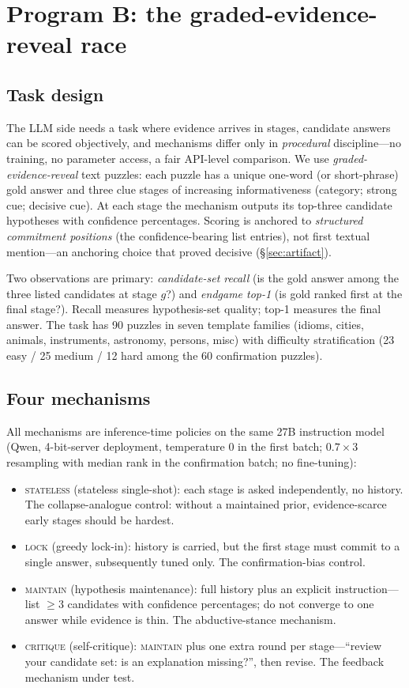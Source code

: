 \documentclass[10pt]{article}
\newcommand{\Mstate}{\textsc{stateless}}
\newcommand{\Mlock}{\textsc{lock}}
\newcommand{\Mmaint}{\textsc{maintain}}
\newcommand{\Mcrit}{\textsc{critique}}
\begin{document}
\section{Program B: the graded-evidence-reveal race}
\label{sec:race}

\subsection{Task design}
\label{sec:taskB}

The LLM side needs a task where evidence arrives in stages, candidate
answers can be scored objectively, and mechanisms differ only in
\emph{procedural} discipline---no training, no parameter access, a fair
API-level comparison. We use \emph{graded-evidence-reveal} text puzzles:
each puzzle has a unique one-word (or short-phrase) gold answer and three
clue stages of increasing informativeness (category; strong cue; decisive
cue). At each stage the mechanism outputs its top-three candidate
hypotheses with confidence percentages. Scoring is anchored to
\emph{structured commitment positions} (the confidence-bearing list
entries), not first textual mention---an anchoring choice that proved
decisive (\S\ref{sec:artifact}).

Two observations are primary: \emph{candidate-set recall} (is the gold
answer among the three listed candidates at stage $g$?) and \emph{endgame
top-1} (is gold ranked first at the final stage?). Recall measures
hypothesis-set quality; top-1 measures the final answer. The task has 90
puzzles in seven template families (idioms, cities, animals, instruments,
astronomy, persons, misc) with difficulty stratification
(23 easy / 25 medium / 12 hard among the 60 confirmation puzzles).

\subsection{Four mechanisms}
\label{sec:mechs}

All mechanisms are inference-time policies on the same 27B instruction
model (Qwen, 4-bit-server deployment, temperature $0$ in the first batch;
$0.7 \times 3$ resampling with median rank in the confirmation batch;
no fine-tuning):
\begin{itemize}
\item \Mstate{} (stateless single-shot): each stage is asked
  independently, no history. The collapse-analogue control: without a
  maintained prior, evidence-scarce early stages should be hardest.
\item \Mlock{} (greedy lock-in): history is carried, but the first stage
  must commit to a single answer, subsequently tuned only. The
  confirmation-bias control.
\item \Mmaint{} (hypothesis maintenance): full history plus an explicit
  instruction---list $\ge 3$ candidates with confidence percentages;
  do not converge to one answer while evidence is thin. The
  abductive-stance mechanism.
\item \Mcrit{} (self-critique): \Mmaint{} plus one extra round per
  stage---``review your candidate set: is an explanation missing?'',
  then revise. The feedback mechanism under test.
\end{itemize}
\end{document}

